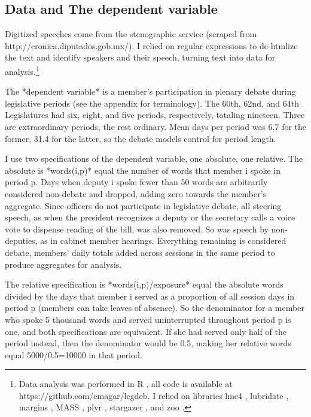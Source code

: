\documentclass[letter,12pt]{article}
\begin{document}
  \subsection{Data and The dependent variable}

Digitized speeches come from the stenographic service (scraped from http://cronica.diputados.gob.mx/). I relied on regular expressions to de-htmlize the text and identify speakers and their speech, turning text into data for analysis.\footnote{Data analysis was performed in R \citep{r.cite}, all code is available at https://github.com/emagar/legdeb. I relied on libraries lme4 \citep{r.lme4}, lubridate \citep{r.lubridate}, margins \citep{r.margins}, MASS \citep{r.mass}, plyr \citep{r.plyr}, stargazer \citep{r.stargazer}, and zoo \citep{r.zoo}.}

The *dependent variable* is a member's participation in plenary debate during legislative periods (see the appendix for terminology). The 60th, 62nd, and 64th Legislatures had six, eight, and five periods, respectively, totaling nineteen. Three are extraordinary periods, the rest ordinary. Mean days per period was 6.7 for the former, 31.4 for the latter, so the debate models control for period length. 

I use two specifications of the dependent variable, one absolute, one relative. The absolute is *words(i,p)* equal the number of words that member i spoke in period p. Days when deputy i spoke fewer than 50 words are arbitrarily considered non-debate and dropped, adding zero towards the member's aggregate. Since officers do not participate in legislative debate, all steering speech, as when the president recognizes a deputy or the secretary calls a voice vote to dispense reading of the bill, was also removed. So was speech by non-deputies, as in cabinet member hearings. Everything remaining is considered debate, members' daily totals added across sessions in the same period to produce aggregates for analysis.

The relative specification is *words(i,p)/exposure* equal the absolute words divided by the days that member i served as a proportion of all session days in period p (members can take leaves of absence). So the denominator for a member who spoke 5 thousand words and served uninterrupted throughout period p is one, and both specifications are equivalent. If she had served only half of the period instead, then the denominator would be 0.5, making her relative words equal 5000/0.5=10000 in that period. 

\end{document}
